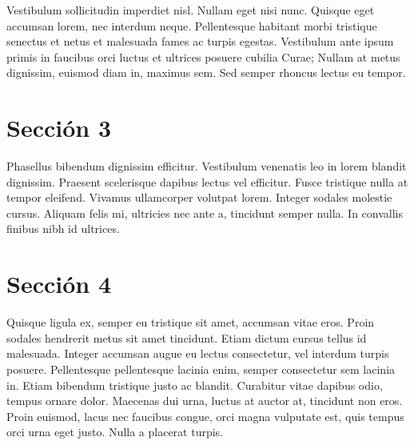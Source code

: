 	Vestibulum sollicitudin imperdiet nisl. Nullam eget nisi nunc. Quisque eget accumsan lorem, nec interdum neque. Pellentesque habitant morbi tristique senectus et netus et malesuada fames ac turpis egestas. Vestibulum ante ipsum primis in faucibus orci luctus et ultrices posuere cubilia Curae; Nullam at metus dignissim, euismod diam in, maximus sem. Sed semper rhoncus lectus eu tempor.
	
	\section{Sección 3}
	
	Phasellus bibendum dignissim efficitur. Vestibulum venenatis leo in lorem blandit dignissim. Praesent scelerisque dapibus lectus vel efficitur. Fusce tristique nulla at tempor eleifend. Vivamus ullamcorper volutpat lorem. Integer sodales molestie cursus. Aliquam felis mi, ultricies nec ante a, tincidunt semper nulla. In convallis finibus nibh id ultrices.

	\section{Sección 4}
	Quisque ligula ex, semper eu tristique sit amet, accumsan vitae eros. Proin sodales hendrerit metus sit amet tincidunt. Etiam dictum cursus tellus id malesuada. Integer accumsan augue eu lectus consectetur, vel interdum turpis posuere. Pellentesque pellentesque lacinia enim, semper consectetur sem lacinia in. Etiam bibendum tristique justo ac blandit. Curabitur vitae dapibus odio, tempus ornare dolor. Maecenas dui urna, luctus at auctor at, tincidunt non eros. Proin euismod, lacus nec faucibus congue, orci magna vulputate est, quis tempus orci urna eget justo. Nulla a placerat turpis.
